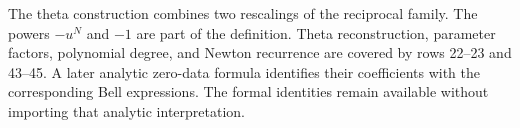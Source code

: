 The theta construction combines two rescalings of the reciprocal family.
The powers $-u^N$ and $-1$ are part of the definition. Theta reconstruction, parameter factors, polynomial degree, and Newton recurrence are covered by rows 22--23 and 43--45. A later analytic zero-data formula identifies their coefficients with the corresponding Bell expressions. The formal identities remain available without importing that analytic interpretation.
